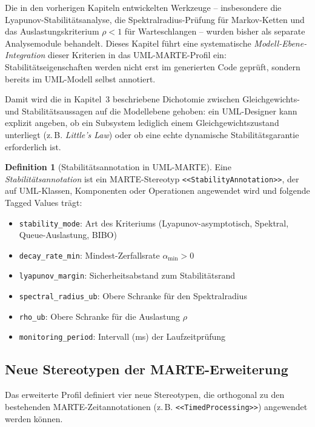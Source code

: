 ﻿\documentclass[a4paper,12pt]{report}
\theoremstyle{definition}
\newtheorem{definition}{Definition}[section]
\begin{document}
Die in den vorherigen Kapiteln entwickelten Werkzeuge -- insbesondere die
Lyapunov-Stabilitätsanalyse, die Spektralradius-Prüfung für Markov-Ketten
und das Auslastungskriterium $\rho < 1$ für Warteschlangen -- wurden bisher
als separate Analysemodule behandelt. Dieses Kapitel führt eine systematische
\textit{Modell-Ebene-Integration} dieser Kriterien in das UML-MARTE-Profil
ein: Stabilitätseigenschaften werden nicht erst im generierten Code geprüft,
sondern bereits im UML-Modell selbst annotiert.

Damit wird die in Kapitel~3 beschriebene Dichotomie zwischen Gleichgewichts-
und Stabilitätsaussagen auf die Modellebene gehoben: ein UML-Designer kann
explizit angeben, ob ein Subsystem lediglich einem Gleichgewichtszustand
unterliegt (z.\,B. \textit{Little's Law}) oder ob eine echte dynamische
Stabilitätsgarantie erforderlich ist.

\begin{definition}[Stabilitätsannotation in UML-MARTE]
	Eine \emph{Stabilitätsannotation} ist ein MARTE-Stereotyp
	\texttt{<<StabilityAnnotation>>}, der auf UML-Klassen, Komponenten oder
	Operationen angewendet wird und folgende Tagged Values trägt:
	\begin{itemize}
		\item[-] \texttt{stability\_mode}: Art des Kriteriums
		(Lyapunov-asymptotisch, Spektral, Queue-Auslastung, BIBO)
		\item[-] \texttt{decay\_rate\_min}: Mindest-Zerfallsrate
		$\alpha_{\min} > 0$
		\item[-] \texttt{lyapunov\_margin}: Sicherheitsabstand zum
		Stabilitätsrand
		\item[-] \texttt{spectral\_radius\_ub}: Obere Schranke für den
		Spektralradius
		\item[-] \texttt{rho\_ub}: Obere Schranke für die Auslastung $\rho$
		\item[-] \texttt{monitoring\_period}: Intervall (ms) der
		Laufzeitprüfung
	\end{itemize}
\end{definition}

\subsection{Neue Stereotypen der MARTE-Erweiterung}

Das erweiterte Profil definiert vier neue Stereotypen, die orthogonal zu
den bestehenden MARTE-Zeitannotationen (z.\,B.
\texttt{<<TimedProcessing>>}) angewendet werden können.
\end{document}
